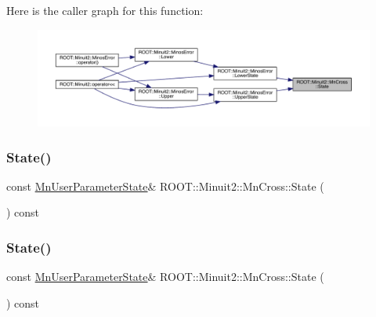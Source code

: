 Here is the caller graph for this function\+:
\nopagebreak
\begin{figure}[H]
\begin{center}
\leavevmode
\includegraphics[width=350pt]{d3/db2/classROOT_1_1Minuit2_1_1MnCross_a97ba8e698ee948a842f0ebe198c0d528_icgraph}
\end{center}
\end{figure}
\mbox{\label{classROOT_1_1Minuit2_1_1MnCross_a97ba8e698ee948a842f0ebe198c0d528}} 
\subsubsection{\texorpdfstring{State()}{State()}\hspace{0.1cm}{\footnotesize\ttfamily [2/3]}}
{\footnotesize\ttfamily const \mbox{\hyperlink{classROOT_1_1Minuit2_1_1MnUserParameterState}{Mn\+User\+Parameter\+State}}\& R\+O\+O\+T\+::\+Minuit2\+::\+Mn\+Cross\+::\+State (\begin{DoxyParamCaption}{ }\end{DoxyParamCaption}) const\hspace{0.3cm}{\ttfamily [inline]}}

\mbox{\label{classROOT_1_1Minuit2_1_1MnCross_a97ba8e698ee948a842f0ebe198c0d528}} 
\subsubsection{\texorpdfstring{State()}{State()}\hspace{0.1cm}{\footnotesize\ttfamily [3/3]}}
{\footnotesize\ttfamily const \mbox{\hyperlink{classROOT_1_1Minuit2_1_1MnUserParameterState}{Mn\+User\+Parameter\+State}}\& R\+O\+O\+T\+::\+Minuit2\+::\+Mn\+Cross\+::\+State (\begin{DoxyParamCaption}{ }\end{DoxyParamCaption}) const\hspace{0.3cm}{\ttfamily [inline]}}

